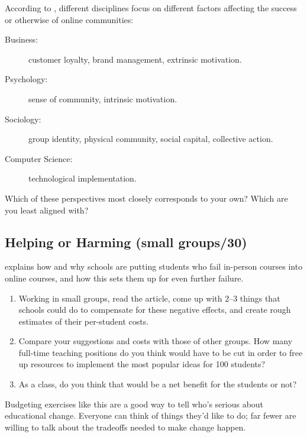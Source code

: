 According to \cite{Irib2009}, different disciplines focus on
different factors affecting the success or otherwise of online
communities:

\begin{description}
\item[Business:]
customer loyalty, brand management, extrinsic motivation.
\item[Psychology:]
sense of community, intrinsic motivation.
\item[Sociology:]
group identity, physical community, social capital, collective
action.
\item[Computer Science:]
technological implementation.
\end{description}

Which of these perspectives most closely corresponds to your own? Which
are you least aligned with?

\subsection*{Helping or Harming (small groups/30)}

explains how and why schools are putting students who fail in-person courses
into online courses, and how this sets them up for even further failure.

\begin{enumerate}
\item
  Working in small groups, read the article, come up with 2--3 things
  that schools could do to compensate for these negative effects, and
  create rough estimates of their per-student costs.
\item
  Compare your suggestions and costs with those of other groups. How
  many full-time teaching positions do you think would have to be cut
  in order to free up resources to implement the most popular ideas
  for 100 students?
\item
  As a class, do you think that would be a net benefit for the
  students or not?
\end{enumerate}

Budgeting exercises like this are a good way to tell who's serious about
educational change. Everyone can think of things they'd like to do; far
fewer are willing to talk about the tradeoffs needed to make change
happen.
